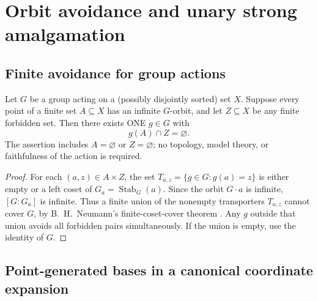 \section{Orbit avoidance and unary strong amalgamation}
\label{sec:finite-orbit-avoidance}

\subsection{Finite avoidance for group actions}

\begin{lemma}
\label{lem:finite-action-avoidance}
Let $G$ be a group acting on a (possibly disjointly sorted)
set $X$.  Suppose every point of a finite set $A\subseteq X$
has an infinite $G$-orbit, and let $Z\subseteq X$ be any
finite forbidden set.  Then there exists ONE $g\in G$ with
\[
                         g(A)\cap Z=\varnothing.
\]
The assertion includes $A=\varnothing$ or $Z=\varnothing$;
no topology, model theory, or faithfulness of the action is
required.
\end{lemma}
\begin{proof}
For each $(a,z)\in A\times Z$, the set
$T_{a,z}=\{g\in G:g(a)=z\}$ is either empty or a left
coset of $G_a=\operatorname{Stab}_G(a)$.  Since the orbit
$G\cdot a$ is infinite, $[G:G_a]$ is infinite.  Thus a
finite union of the nonempty transporters $T_{a,z}$ cannot
cover $G$, by B.~H.~Neumann's finite-coset-cover theorem
\cite{NeumannCover}.  Any $g$ outside that union avoids all
forbidden pairs simultaneously.  If the union is empty,
use the identity of $G$.
\end{proof}

\subsection{Point-generated bases in a canonical coordinate expansion}

